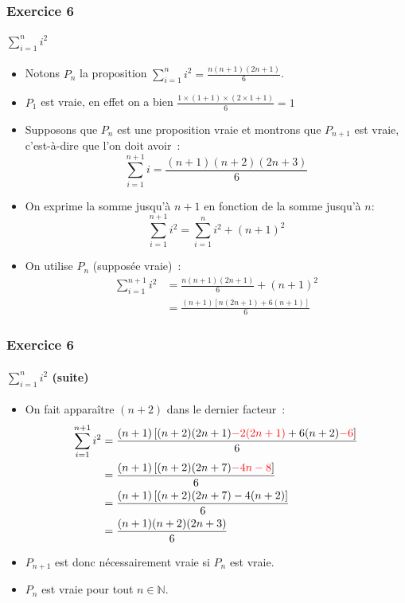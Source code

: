\documentclass[10pt,notheorems]{beamer}
\newcommand{\red}{\color{red}}
\theoremstyle{plain}
\theoremstyle{definition} %
\begin{document}
\begin{frame}
  \frametitle{Exercice 6}
  \framesubtitle{$\sum_{i=1}^n i^2$}
  \fontsize{8}{10}\selectfont

  \begin{itemize}

  \item Notons $P_n$ la proposition $\sum_{i=1}^n i^2 = \frac{n(n+1)(2n+1)}{6}$.\newline

  \item $P_1$ est vraie, en effet on a bien $\frac{1 \times (1+1) \times (2\times 1 + 1)}{6} = 1$\newline

  \item Supposons que $P_n$ est une proposition vraie et montrons que $P_{n+1}$ est vraie, c'est-à-dire  que l'on doit avoir~:
    \[
      \sum_{i=1}^{n+1} i = \frac{(n+1)(n+2)(2n+3)}{6}
    \]

  \item On exprime la somme jusqu'à $n+1$ en fonction de la somme jusqu'à $n$:
    \[
      \sum_{i=1}^{n+1} i^2 = \sum_{i=1}^{n} i^2 + (n+1)^2
    \]

  \item On utilise $P_n$ (supposée vraie)~:
    \[
      \begin{split}
        \sum_{i=1}^{n+1} i^2 &= \frac{n(n+1)(2n+1)}{6} + (n+1)^2\\
        &= \frac{(n+1)\left[n(2n+1)+6(n+1)\right]}{6}
      \end{split}
    \]

  \end{itemize}

\end{frame}


\begin{frame}
  \frametitle{Exercice 6}
  \framesubtitle{$\sum_{i=1}^n i^2$ (suite)}
  \fontsize{8}{10}\selectfont

  \begin{itemize}

  \item On fait apparaître $(n+2)$ dans le dernier facteur~:
    \[
      \begin{split}
        \sum_{i=1}^{n+1} i^2 &= \frac{(n+1)\left[(n+2)(2n+1){\red -2(2n+1)}+6(n+2){\red-6}\right]}{6}\\
        &= \frac{(n+1)\left[(n+2)(2n+7){\red -4n-8}\right]}{6}\\
        &= \frac{(n+1)\left[(n+2)(2n+7)-4(n+2)\right]}{6}\\
        &= \frac{(n+1)(n+2)(2n+3)}{6}\\
      \end{split}
    \]

  \item $P_{n+1}$ est donc nécessairement vraie si $P_{n}$ est vraie.\newline

  \item $P_n$ est vraie pour tout $n\in\mathbb N$.

  \end{itemize}

\end{frame}
\end{document}
